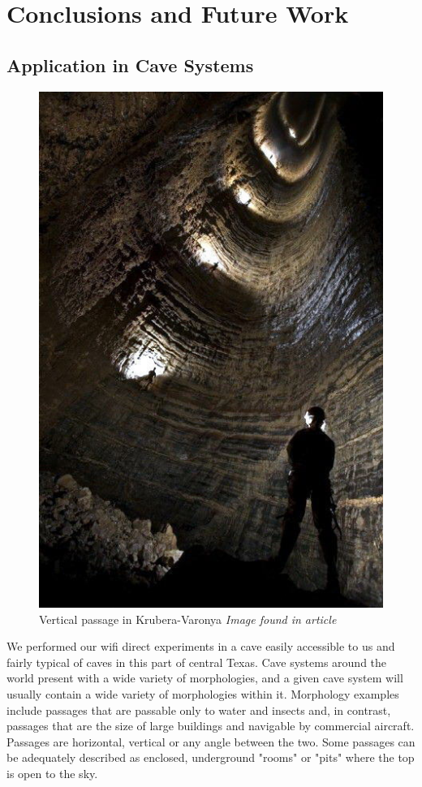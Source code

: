 \documentclass[10pt,twocolumn]{article}
\begin{document}
\section{Conclusions and Future Work}

\subsection{Application in Cave Systems}
\label{sec:Application in Cave Systems}
\begin{figure}
\includegraphics[width=\columnwidth]{krubera_pit_dark}
\caption{Vertical passage in Krubera-Varonya \textit{Image found in article \cite{krub_blaze}}}
\end{figure}
We performed our wifi direct experiments in a cave easily accessible to us and fairly typical of caves in this part of central Texas.
Cave systems around the world present with a wide variety of morphologies, and a given cave system will usually contain a wide variety of morphologies within it.
Morphology examples include passages that are passable only to water and insects and, in contrast, passages that are the size of large buildings and navigable by commercial aircraft.
Passages are horizontal, vertical or any angle between the two.
Some passages can be adequately described as enclosed, underground "rooms" or "pits" where the top is open to the sky.
\end{document}
